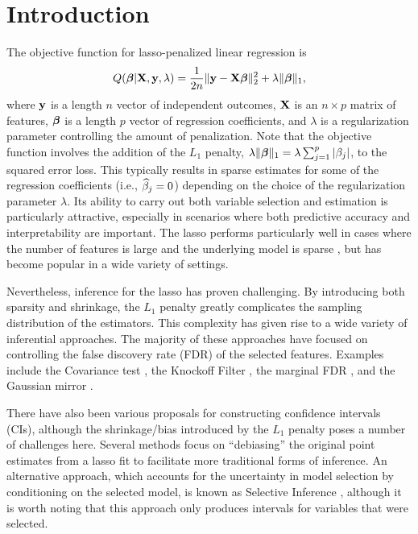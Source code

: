 \section{Introduction}

The objective function for lasso-penalized linear regression \citep{Tibshirani1996} is
$$Q(\boldsymbol{\beta}|\mathbf{X},\mathbf{y},\lambda) = \frac{1}{2n}\lVert\mathbf{y} - \mathbf{X}\boldsymbol{\beta}\rVert_2^2 + \lambda\lVert\boldsymbol{\beta}\rVert_1,$$
where $\mathbf{y}$ is a length $n$ vector of independent outcomes, $\mathbf{X}$ is an $n \times p$ matrix of features, $\boldsymbol{\beta}$ is a length $p$ vector of regression coefficients, and $\lambda$ is a regularization parameter controlling the amount of penalization. Note that the objective function involves the addition of the $L_1$ penalty, $\lambda\lVert\boldsymbol{\beta}\rVert_1 = \lambda \sum_{j = 1}^p |\beta_j|$, to the squared error loss. This typically results in sparse estimates for some of the regression coefficients (i.e., $\widehat{\beta}_j = 0$) depending on the choice of the regularization parameter $\lambda$. Its ability to carry out both variable selection and estimation is particularly attractive, especially in scenarios where both predictive accuracy and interpretability are important. The lasso performs particularly well in cases where the number of features is large and the underlying model is sparse \citep{HTF2009}, but has become popular in a wide variety of settings.

Nevertheless, inference for the lasso has proven challenging. By introducing both sparsity and shrinkage, the $L_1$ penalty greatly complicates the sampling distribution of the estimators. This complexity has given rise to a wide variety of inferential approaches. The majority of these approaches have focused on controlling the false discovery rate (FDR) of the selected features. Examples include the Covariance test \citep{Lockhart2014}, the Knockoff Filter \citep{Candes2015,Candes2018}, the marginal FDR \citep{Breheny2019}, and the Gaussian mirror \citep{Xing2023}.

There have also been various proposals for constructing confidence intervals (CIs), although the shrinkage/bias introduced by the $L_1$ penalty poses a number of challenges here. Several methods \citep{ZhangZhang2014, Javanmard2014} focus on ``debiasing'' the original point estimates from a lasso fit to facilitate more traditional forms of inference. An alternative approach, which accounts for the uncertainty in model selection by conditioning on the selected model, is known as Selective Inference \citep{Lee2016}, although it is worth noting that this approach only produces intervals for variables that were selected.

